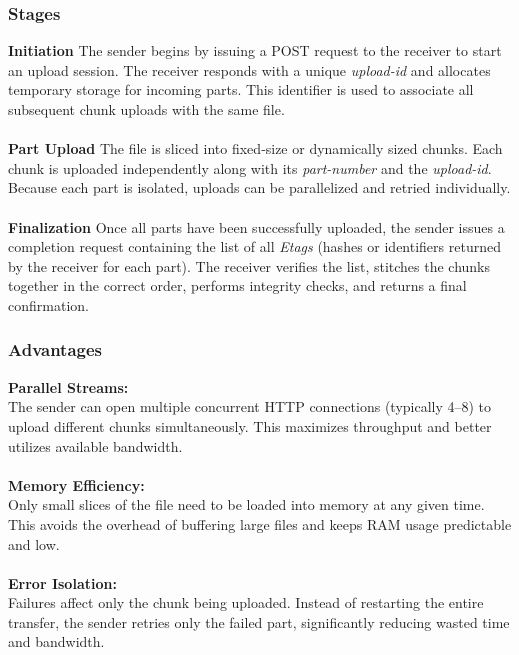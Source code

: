 \documentclass[11pt,a4paper]{article}
\begin{document}
	\subsubsection{Stages}
	
	\textbf{Initiation}  
	The sender begins by issuing a POST request to the receiver to start an upload session.  
	The receiver responds with a unique \textit{upload-id} and allocates temporary storage for incoming parts. This identifier is used to associate all subsequent chunk uploads with the same file.
	\\\\
	\textbf{Part Upload}  
	The file is sliced into fixed‑size or dynamically sized chunks. Each chunk is uploaded independently along with its \textit{part-number} and the \textit{upload-id}.  
	Because each part is isolated, uploads can be parallelized and retried individually.
	\\\\
	\textbf{Finalization}  
	Once all parts have been successfully uploaded, the sender issues a completion request containing the list of all \textit{Etags} (hashes or identifiers returned by the receiver for each part).  
	The receiver verifies the list, stitches the chunks together in the correct order, performs integrity checks, and returns a final confirmation.
	
	\subsubsection{Advantages}
	
	\textbf{Parallel Streams:}\\ 
	The sender can open multiple concurrent HTTP connections (typically 4–8) to upload different chunks simultaneously. This maximizes throughput and better utilizes available bandwidth.\\
	\\
	\textbf{Memory Efficiency:}\\  
	Only small slices of the file need to be loaded into memory at any given time. This avoids the overhead of buffering large files and keeps RAM usage predictable and low.\\
	\\
	\textbf{Error Isolation:} \\
	Failures affect only the chunk being uploaded. Instead of restarting the entire transfer, the sender retries only the failed part, significantly reducing wasted time and bandwidth.
	
\end{document}
